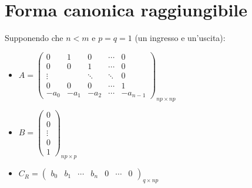 \documentclass{report}
\theoremstyle{nostyle}
\begin{document}
\section{Forma canonica raggiungibile}
Supponendo che $n < m$ e $p = q = 1$ (un ingresso e un'uscita):
\begin{itemize}
    \item $\displaystyle A = \begin{pmatrix}
        0 & 1 & 0 & \cdots & 0 \\
        0 & 0 & 1 & \cdots & 0 \\
        \vdots &  & \ddots & \ddots & 0 \\
        0 & 0 & 0 & \cdots & 1 \\
        -a_0 & -a_1 & -a_2 & \cdots & -a_{n-1} 
    \end{pmatrix}_{np\times np}$

    \item $\displaystyle B = \begin{pmatrix}
        0 \\ 0 \\ \vdots \\ 0 \\ 1
    \end{pmatrix}_{np \times p}$

    \item $\displaystyle C_R = \begin{pmatrix}
        b_0 & b_1 & \cdots & b_n & 0 & \cdots & 0
    \end{pmatrix}_{q\times np}$
\end{itemize}

\newpage
\end{document}
